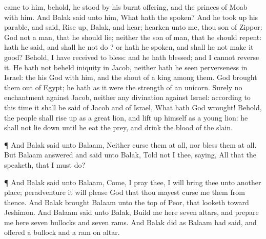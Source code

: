 {came to him, behold, he
stood by his burnt
offering, and the
princes of
Moab with him. And
Balak
said unto him, What hath the
{}
spoken?
And he took
up his
parable, and
said, Rise
up,
Balak, and
hear;
hearken unto me, thou
son of
Zippor:
God
{} not a
man, that he should
lie; neither the
son of
man, that he should
repent: hath he
said, and shall he not
do
{}? or hath he
spoken, and shall he not make it
good?
Behold, I have
received
{} to
bless: and he hath
blessed; and I cannot
reverse it.
He hath not
beheld
iniquity in
Jacob, neither hath he
seen
perverseness in
Israel: the
{} his
God
{} with him, and the
shout of a
king
{} among them.
God brought them
out of
Egypt; he hath as it were the
strength of an
unicorn.
Surely
{} no
enchantment against
Jacob, neither
{} any
divination against
Israel: according to this
time it shall be
said of
Jacob and of
Israel, What hath
God
wrought!
Behold, the
people shall rise
up as a great
lion, and lift
up himself as a young
lion: he shall not lie
down until he
eat
{} the
prey, and
drink the
blood of the
slain.
\par }{\PP {}¶ And
Balak
said unto
Balaam, Neither
curse them at
all, nor
bless them at
all.
But
Balaam
answered and
said unto
Balak,
Told not I thee,
saying, All that the
{}
speaketh, that I must
do?
\par }{\PP {}¶ And
Balak
said unto
Balaam,
Come, I pray thee, I will
bring thee unto
another
place; peradventure it will
please
God that thou mayest
curse me them from thence.
And
Balak
brought
Balaam unto the
top of
Peor, that
looketh
toward
Jeshimon.
And
Balaam
said unto
Balak,
Build me here
seven
altars, and
prepare me here
seven
bullocks and
seven
rams.
And
Balak
did as
Balaam had
said, and
offered a
bullock and a
ram on
{}
altar.

}
